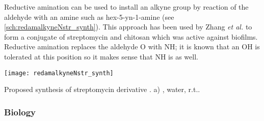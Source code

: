 Reductive amination can be used to install an alkyne group by reaction of the aldehyde with an amine such as hex-5-yn-1-amine  (see \ref{sch:redamalkyneNstr_synth}). This approach has been used by Zhang \textit{et al.}\cite{Zhang2013} to form a conjugate of streptomycin  and chitosan which was active against biofilms. 
Reductive amination replaces the aldehyde O with NH; it is known that an OH is tolerated at this position so it makes sense that NH is as well.

\begin{scheme}[H]
	\begin{center}
		\texttt{[image: redamalkyneNstr\_synth]}
		\caption{Proposed synthesis of streptomycin derivative . 
		a) , water, r.t..
		\label{sch:redamalkyneNstr_synth}}
	\end{center}
\end{scheme}


\subsubsection{Biology}